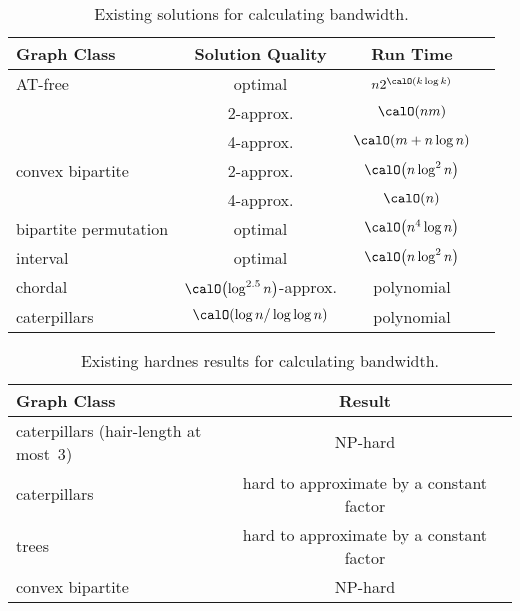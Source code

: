 \begin{table}
    [htb]
    \centering
    \caption
    {%
        Existing solutions for calculating bandwidth.
    }
    \label{tbl:ExisPosBwResults}
%
    \def\arraystretch{1.15}
    \begin{tabular}{lccc}
        \hline
        Graph Class
            & Solution Quality
            & Run Time
            & \\
        \hline
        AT-free
            & optimal
            & $n2^{\calO(k \log k)}$
            & \cite{GolHegKraLok2011} \\
            & 2-approx.
            & $\calO(nm)$
            & \cite{KlokKratMuel1999} \\
            & 4-approx.
            & $\calO(m + n \log n)$
            & \cite{KlokKratMuel1999} \\
        convex bipartite
            & 2-approx.
            & $\calO \! \left( n \log^2 n \right)$
            & \cite{ShreTayuUen2012} \\
            & 4-approx.
            & $\calO(n)$
            & \cite{ShreTayuUen2012} \\
        bipartite permutation
            & optimal
            & $\calO \! \left( n^4 \log n \right)$
            & \cite{HeggKratMeis2009} \\
        interval
            & optimal
            & $\calO \! \left( n \log^2 n \right)$
            & \cite{Sprague1994} \\
        chordal
            & $\calO \! \left( \log^{2.5} n \right)$-approx.
            & polynomial
            & \cite{Gupta2001} \\
        caterpillars
            & $\calO(\log n / \log \log n)$
            & polynomial
            & \cite{FeigeTalwar2009} \\
        \hline
    \end{tabular}
\end{table}

\begin{table}
    [htb]
    \centering
    \caption
    {%
        Existing hardnes results for calculating bandwidth.
    }
    \label{tbl:ExisHardBwResults}
%
    \def\arraystretch{1.15}
    \begin{tabular}{lcc}
        \hline
        Graph Class
            & Result
            & \\
        \hline
        caterpillars (hair-length at most~$3$)
            & NP-hard
            & \cite{Monien1986} \\
        caterpillars
            & hard to approximate by a constant factor
            & \cite{DubeyFeige2011} \\
        trees
            & hard to approximate by a constant factor
            & \cite{BlacKarpWirt1998} \\
        convex bipartite
            & NP-hard
            & \cite{ShreTayuUen2012} \\
        \hline
    \end{tabular}
\end{table}

